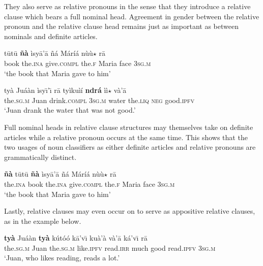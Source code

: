 \documentclass[output=paper,modfonts,nonflat]{langsci/langscibook}
\begin{document}
They also serve as relative pronouns in the sense that they introduce a relative clause which bears a full nominal head.  Agreement in gender between the relative pronoun and the relative clause head remains just as important as between nominals and definite articles.

\ea {}\label{ex:cisneros:56}
\gll
t\=ut\=u \textbf{\~n\`a} \`isy\=a'\=a {\ob}\~n\'a M\'ar\'i\'a{\cb} {\ob}n\`u\`u$\star$ r\=a{\cb}\\
book the.\textsc{ina} give.\textsc{compl} {\db}the.\textsc{f} Maria {\db}face 3\textsc{sg.m}\\
\glt
`the book that Maria gave to him'
\z 

\ea {}\label{ex:cisneros:57}
\gll
{\ob}ty\`a Ju\'a\`an{\cb} \`isy\=\i'\=\i{} r\=a {\ob}ty\`iku\`i\'i \textbf{ndr\'a} \`i\`i$\star$ v\`a'\=a{\cb}\\
{\db}the.\textsc{sg.m} Juan drink.\textsc{compl} 3\textsc{sg.m} {\db}water the.\textsc{liq} \textsc{neg} good.\textsc{ipfv}\\
\glt
`Juan drank the water that was not good.'
\z

Full nominal heads in relative clause structures may themselves take on definite articles while a relative pronoun occurs at the same time.  This shows that the two usages of noun classifiers as either definite articles and relative pronouns are grammatically distinct.

\ea {}\label{ex:cisneros:58}
\gll
{\ob}\textbf{\~n\`a} t\=ut\=u{\cb} \textbf{\~n\`a} \`isy\=a'\=a {\ob}\~n\'a M\'ar\'i\'a{\cb} {\ob}n\`u\`u$\star$ r\=a{\cb}\\
{\db}the.\textsc{ina} book the.\textsc{ina} give.\textsc{compl} {\db}the.\textsc{f} Maria {\db}face 3\textsc{sg.m}\\
\glt
`the book that Maria gave to him'
\z 

Lastly, relative clauses may even occur on  to serve as appositive relative clauses, as in the example below.

\ea {}\label{ex:cisneros:59}
\gll
{\ob}\textbf{ty\`a} Ju\'a\`an \textbf{ty\`a} k\'ut\'o\'o k\=a'v\=\i{}{\cb} ku\`a'\`a v\`a'\=a k\'a'v\=\i{} r\=a\\
{\db}the.\textsc{sg.m} Juan the.\textsc{sg.m} like.\textsc{ipfv} read.\textsc{irr} much good read.\textsc{ipfv} 3\textsc{sg.m}\\
\glt
`Juan, who likes reading, reads a lot.'
\z 
\end{document}
